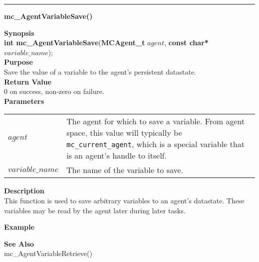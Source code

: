 \noindent
\vspace{5pt}
\rule{6.5in}{0.015in}
\noindent
{}
{\LARGE \bf mc\_AgentVariableSave()}\\

\noindent
\label{apidoc:mc_AgentVariableSave}
{\bf Synopsis}\\
{\bf int mc\_AgentVariableSave}({\bf MCAgent\_t} $agent$, {\bf const char*} $variable\_name$);\\

\noindent
{\bf Purpose}\\
Save the value of a variable to the agent's persistent datastate. \\

\noindent
{\bf Return Value}\\
0 on success, non-zero on failure. \\

\noindent
{\bf Parameters}
\vspace{-0.1in}
\begin{description}
\item
\begin{tabular}{p{25 mm}p{130 mm}}
$agent$ & The agent for which to save a variable. From agent space, this value 
will typically be \texttt{mc\_current\_agent}, which is a special variable that
is an agent's handle to itself. \\
$variable\_name$ & The name of the variable to save.
\end{tabular}
\end{description}

\noindent
{\bf Description}\\
This function is used to save arbitrary variables to an agent's datastate. These
variables may be read by the agent later during later tasks.

\noindent
{\bf Example}\\
\noindent
{\footnotesize}

\noindent
{\bf See Also}\\
    mc\_AgentVariableRetrieve()

